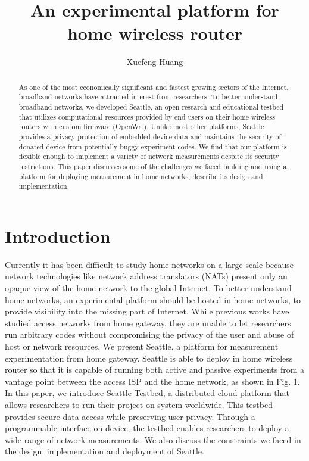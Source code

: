 \documentclass[conference]{IEEEtran}   	%
\title{An experimental platform for home wireless router}
\author{Xuefeng Huang}
\begin{document}
\maketitle
\begin{abstract}
As one of the most economically significant and fastest growing sectors of the Internet, broadband networks have attracted interest from researchers. To better understand broadband networks, we developed Seattle, an open research and educational testbed that utilizes computational resources provided by end users on their home wireless routers with custom firmware (OpenWrt\cite{openwrt}). Unlike most other platforms, Seattle provides a privacy protection of embedded device data and maintains the security of donated device from potentially buggy experiment codes. We find that our platform is flexible enough to implement a variety of network measurements despite its security restrictions. This paper discusses some of the challenges we faced building and using a platform for deploying measurement in home networks, describe its design and implementation.
\end{abstract}
\section{Introduction}
Currently it has been difficult to study home networks on a large scale because network technologies like network address translators (NATs) present only an opaque view of the home network to the global Internet. To better understand home networks, an experimental platform should be hosted in home networks, to provide visibility into the missing part of Internet. While previous works\cite{183951} have studied access networks from home gateway, they are unable to let researchers run arbitrary codes without compromising the privacy of the user and abuse of host or network resources. We present Seattle, a platform for measurement experimentation from home gateway. Seattle is able to deploy in home wireless router so that it is capable of running both active and passive experiments from a vantage point between the access ISP and the home network, as shown in Fig. 1.
\newline
In this paper, we introduce Seattle Testbed\cite{cappos2009seattle}, a distributed cloud platform that allows researchers to run their project on system worldwide. This testbed provides secure data access while preserving user privacy. Through a programmable interface on device, the testbed enables researchers to deploy a wide range of network measurements. We also discuss the constraints we faced in the design, implementation and deployment of Seattle.
\end{document}
